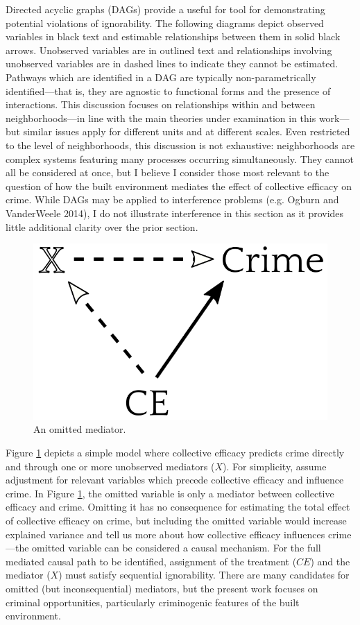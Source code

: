 \documentclass [11pt, proquest] {uwthesis}[2015/03/03]
\begin{document}
Directed acyclic graphs (DAGs) provide a useful for tool for demonstrating potential violations of ignorability. The following diagrams depict observed variables in black text and estimable relationships between them in solid black arrows. Unobserved variables are in outlined text and relationships involving unobserved variables are in dashed lines to indicate they cannot be estimated. Pathways which are identified in a DAG are typically non-parametrically identified---that is, they are agnostic to functional forms and the presence of interactions. This discussion focuses on relationships within and between neighborhoods---in line with the main theories under examination in this work---but similar issues apply for different units and at different scales. Even restricted to the level of neighborhoods, this discussion is not exhaustive: neighborhoods are complex systems featuring many processes occurring simultaneously. They cannot all be considered at once, but I believe I consider those most relevant to the question of how the built environment mediates the effect of collective efficacy on crime. While DAGs may be applied to interference problems (e.g. Ogburn and VanderWeele 2014), I do not illustrate interference in this section as it provides little additional clarity over the prior section.\linebreak
\linebreak
\begin{figure}

{\centering \includegraphics[width=0.4\linewidth]{./figure/appendix/1_omitted_mediator} 

}

\caption{An omitted mediator.}\label{fig:dag1}
\end{figure}
Figure \ref{fig:dag1} depicts a simple model where collective efficacy predicts crime directly and through one or more unobserved mediators (\(X\)). For simplicity, assume adjustment for relevant variables which precede collective efficacy and influence crime. In Figure \ref{fig:dag1}, the omitted variable is only a mediator between collective efficacy and crime. Omitting it has no consequence for estimating the total effect of collective efficacy on crime, but including the omitted variable would increase explained variance and tell us more about how collective efficacy influences crime---the omitted variable can be considered a causal mechanism. For the full mediated causal path to be identified, assignment of the treatment (\(CE\)) and the mediator (\(X\)) must satisfy sequential ignorability. There are many candidates for omitted (but inconsequential) mediators, but the present work focuses on criminal opportunities, particularly criminogenic features of the built environment.\linebreak
\end{document}

